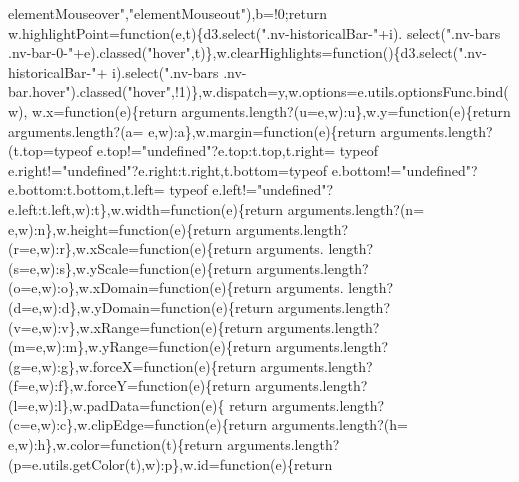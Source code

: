 \begin{DoxyCode}
{      elementMouseover"},\textcolor{stringliteral}{"elementMouseout"}),b=!0;\textcolor{keywordflow}{return} w.highlightPoint=\textcolor{keyword}{function}(e,t)\{d3.select(\textcolor{stringliteral}{".nv-historicalBar-"}+i).
      select(\textcolor{stringliteral}{".nv-bars .nv-bar-0-"}+e).classed(\textcolor{stringliteral}{"hover"},t)\},w.clearHighlights=\textcolor{keyword}{function}()\{d3.select(\textcolor{stringliteral}{".nv-historicalBar-"}+
      i).select(\textcolor{stringliteral}{".nv-bars .nv-bar.hover"}).classed(\textcolor{stringliteral}{"hover"},!1)\},w.dispatch=y,w.options=e.utils.optionsFunc.bind(w),
      w.x=\textcolor{keyword}{function}(e)\{\textcolor{keywordflow}{return} arguments.length?(u=e,w):u\},w.y=\textcolor{keyword}{function}(e)\{\textcolor{keywordflow}{return} arguments.length?(a=
      e,w):a\},w.margin=\textcolor{keyword}{function}(e)\{\textcolor{keywordflow}{return} arguments.length?(t.top=typeof e.top!=\textcolor{stringliteral}{"undefined"}?e.top:t.top,t.right=
      typeof e.right!=\textcolor{stringliteral}{"undefined"}?e.right:t.right,t.bottom=typeof e.bottom!=\textcolor{stringliteral}{"undefined"}?e.bottom:t.bottom,t.left=
      typeof e.left!=\textcolor{stringliteral}{"undefined"}?e.left:t.left,w):t\},w.width=\textcolor{keyword}{function}(e)\{\textcolor{keywordflow}{return} arguments.length?(n=
      e,w):n\},w.height=\textcolor{keyword}{function}(e)\{\textcolor{keywordflow}{return} arguments.length?(r=e,w):r\},w.xScale=\textcolor{keyword}{function}(e)\{\textcolor{keywordflow}{return} arguments.
      length?(s=e,w):s\},w.yScale=\textcolor{keyword}{function}(e)\{\textcolor{keywordflow}{return} arguments.length?(o=e,w):o\},w.xDomain=\textcolor{keyword}{function}(e)\{\textcolor{keywordflow}{return} arguments.
      length?(d=e,w):d\},w.yDomain=\textcolor{keyword}{function}(e)\{\textcolor{keywordflow}{return} arguments.length?(v=e,w):v\},w.xRange=\textcolor{keyword}{function}(e)\{\textcolor{keywordflow}{return} 
      arguments.length?(m=e,w):m\},w.yRange=\textcolor{keyword}{function}(e)\{\textcolor{keywordflow}{return} arguments.length?(g=e,w):g\},w.forceX=\textcolor{keyword}{function}(e)\{\textcolor{keywordflow}{return} 
      arguments.length?(f=e,w):f\},w.forceY=\textcolor{keyword}{function}(e)\{\textcolor{keywordflow}{return} arguments.length?(l=e,w):l\},w.padData=\textcolor{keyword}{function}(e)\{\textcolor{keywordflow}{
      return} arguments.length?(c=e,w):c\},w.clipEdge=\textcolor{keyword}{function}(e)\{\textcolor{keywordflow}{return} arguments.length?(h=
      e,w):h\},w.color=\textcolor{keyword}{function}(t)\{\textcolor{keywordflow}{return} arguments.length?(p=e.utils.getColor(t),w):p\},w.id=\textcolor{keyword}{function}(e)\{\textcolor{keywordflow}{return} 

\end{DoxyCode}
